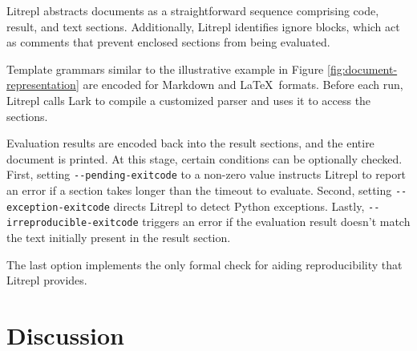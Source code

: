 \documentclass[a4paper,12pt,twocolumn]{article}
\newcommand{\Latex}{\LaTeX\ }
\begin{document}
Litrepl abstracts documents as a straightforward sequence comprising code,
result, and text sections. Additionally, Litrepl identifies ignore blocks, which
act as comments that prevent enclosed sections from being evaluated.

Template grammars similar to the illustrative example in Figure
\ref{fig:document-representation} are encoded for Markdown and \Latex formats.
Before each run, Litrepl calls Lark\cite{Lark} to compile a customized parser
and uses it to access the sections.

Evaluation results are encoded back into the result sections, and the entire
document is printed. At this stage, certain conditions can be optionally
checked. First, setting \verb|--pending-exitcode| to a non-zero value instructs
Litrepl to report an error if a section takes longer than the timeout to
evaluate. Second, setting \verb|--exception-exitcode| directs Litrepl to detect
Python exceptions. Lastly, \verb|--irreproducible-exitcode| triggers an error if
the evaluation result doesn't match the text initially present in the result
section.

The last option implements the only formal check for aiding reproducibility that
Litrepl provides.

\section{Discussion}
\end{document}
